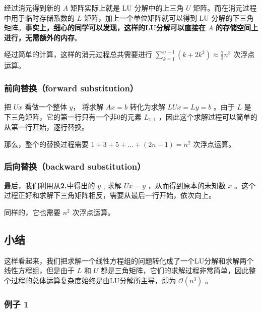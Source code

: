 经过消元得到新的 $A$ 矩阵实际上就是 LU 分解中的上三角 $U$ 矩阵。而在消元过程中用于临时存储系数的 $L$ 矩阵，加上一个单位矩阵就可以得到 LU 分解的下三角矩阵。\textbf{事实上，细心的同学可以发现，这样的LU分解可以直接在} $A$ \textbf{的存储空间上进行，无需额外的内存}。

经过简单的计算，这样的消元过程总共需要进行 $\sum_{k=1}^{n-1}(k+2k^2)\approx \frac{2}{3}n^3$ 次浮点运算。

\subsubsection{前向替换（forward substitution）}

把 $Ux$ 看做一个整体 $y$， 将求解 $Ax=b$ 转化为求解 $LUx=Ly=b$ 。由于 $L $ 是下三角矩阵，它的第一行只有一个非0的元素 $L_{1,1}$ ，因此这个求解过程可以简单的从第一行开始，逐行替换。

那么，整个的替换过程需要 $1+3+5+...+(2n-1)=n^2$ 次浮点运算。

\subsubsection{后向替换（backward substitution）}

最后，我们利用从\textbf{2.}中得出的 $y$ , 求解 $Ux=y$ ，从而得到原本的未知数 $x$ 。这个过程正好和求解下三角矩阵相反，需要从最后一行开始，依次向上。

同样的，它也需要 $n^2$ 次浮点运算。

\subsection{小结}

这样看起来，我们把求解一个线性方程组的问题转化成了一个LU分解和求解两个线性方程组，但是由于 $L$ 和 $U$ 都是三角矩阵，它们的求解过程非常简单，因此整个过程的总体运算复杂度始终是由LU分解所主导，即为 $\mathcal{O}(n^3)$ 。

\subsubsection{例子 1}

